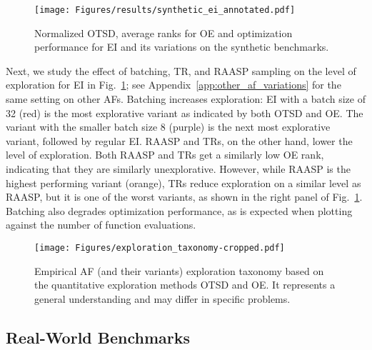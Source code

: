\documentclass[accepted]{uai2025}
\begin{document}
\begin{figure}[tb]
    \centering
    \texttt{[image: Figures/results/synthetic\_ei\_annotated.pdf]}
    \caption{Normalized \ac{OTSD}, average ranks for \ac{OE} and optimization performance for \ac{EI} and its variations on the synthetic benchmarks.}
    \label{fig:synthetic_benchmarks_basic_ei}
\end{figure}

Next, we study the effect of batching, \ac{TR}, and \ac{RAASP} sampling on the level of exploration for \ac{EI} in 
Fig.~\ref{fig:synthetic_benchmarks_basic_ei}; see Appendix~\ref{app:other_af_variations} for the same setting on other \acp{AF}.
Batching increases exploration: \ac{EI} with a batch size of 32 (red) is the most explorative variant as indicated by both \ac{OTSD} and \ac{OE}.
The variant with the smaller batch size 8 (purple) is the next most explorative variant, followed by regular \ac{EI}.
\ac{RAASP} and \acp{TR}, on the other hand, lower the level of exploration.
Both \ac{RAASP} and \acp{TR} get a similarly low \ac{OE} rank, indicating that they are similarly unexplorative.
However, while \ac{RAASP} is the highest performing variant (orange), \acp{TR} reduce exploration on a similar level as \ac{RAASP}, but it is one of the worst variants, as shown in the right panel of Fig.~\ref{fig:synthetic_benchmarks_basic_ei}.
Batching also degrades optimization performance, as is expected when plotting against the number of function evaluations.

\begin{figure*}[t]
    \centering

    \texttt{[image: Figures/exploration\_taxonomy-cropped.pdf]}
    \caption{Empirical \ac{AF} (and their variants) exploration taxonomy based on the quantitative exploration methods \ac{OTSD} and \ac{OE}. It represents a general understanding and may differ in specific problems.}
    \label{fig:taxonomy}
\end{figure*}

\subsection{Real-World Benchmarks}
\end{document}
